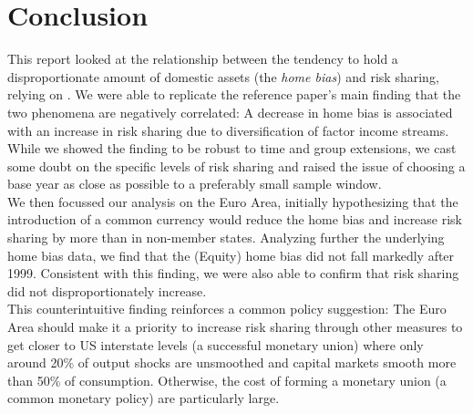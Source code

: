 \documentclass[11pt,a4paper]{article}
\begin{document}
\section{Conclusion}\label{sec:conclusion}
This report looked at the relationship between the tendency to hold a disproportionate amount of domestic assets (the \textit{home bias}) and risk sharing, relying on \textcite{main}. We were able to replicate the reference paper's main finding that the two phenomena are negatively correlated: A decrease in home bias is associated with an increase in risk sharing due to diversification of factor income streams. While we showed the finding to be robust to time and group extensions, we cast some doubt on the specific levels of risk sharing and raised the issue of choosing a base year as close as possible to a preferably small sample window.\\
We then focussed our analysis on the Euro Area, initially hypothesizing that the introduction of a common currency would reduce the home bias and increase risk sharing by more than in non-member states. Analyzing further the underlying home bias data, we find that the (Equity) home bias did not fall markedly after 1999. Consistent with this finding, we were also able to confirm that risk sharing did not disproportionately increase.\\
This counterintuitive finding reinforces a common policy suggestion: The Euro Area should make it a priority to increase risk sharing through other measures to get closer to US interstate levels (a successful monetary union) where only around 20\% of output shocks are unsmoothed and capital markets smooth more than 50\% of consumption. Otherwise, the cost of forming a monetary union (a common monetary policy) are particularly large.
\end{document}
